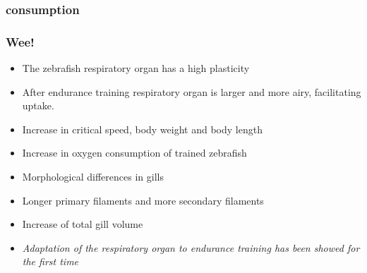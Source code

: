 \documentclass[aspectratio=169, 10pt]{beamer}
\begin{document}
\begin{frame}
	\frametitle{ consumption}
	
\end{frame}

\begin{frame}
	\frametitle{Wee!}
	\begin{itemize}
		\item The zebrafish respiratory organ has a high plasticity
		\item After endurance training respiratory organ is larger and more airy, facilitating  uptake.
		\item Increase in critical speed, body weight and body length
		\item Increase in oxygen consumption of trained zebrafish
		\item Morphological differences in gills
		\item Longer primary filaments and more secondary filaments
		\item Increase of total gill volume
		\pause
		\item \emph{Adaptation of the respiratory organ to endurance training has been showed for the first time}
	\end{itemize}
\end{frame}
\end{document}
